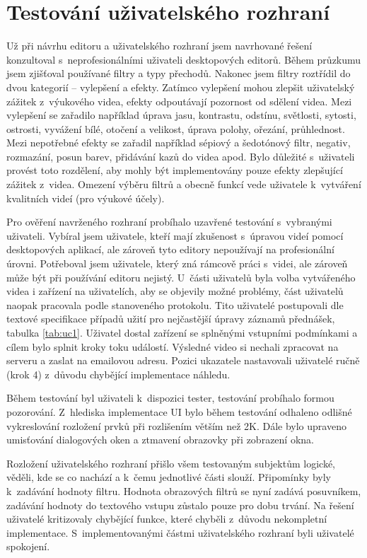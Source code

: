 \section{Testování uživatelského rozhraní}
Už při návrhu editoru a uživatelského rozhraní jsem navrhované řešení konzultoval s~neprofesionálními uživateli desktopových editorů. Během průzkumu jsem zjišťoval používané filtry a typy přechodů. Nakonec jsem filtry roztřídil do dvou kategorií -- vylepšení a efekty. Zatímco vylepšení mohou zlepšit uživatelský zážitek z~výukového videa, efekty odpoutávají pozornost od sdělení videa. Mezi vylepšení se zařadilo například úprava jasu, kontrastu, odstínu, světlosti, sytosti, ostrosti, vyvážení bílé, otočení a velikost, úprava polohy, ořezání, průhlednost. Mezi nepotřebné efekty se zařadil například sépiový a šedotónový filtr, negativ, rozmazání, posun barev, přidávání kazů do videa apod. Bylo důležité s~uživateli provést toto rozdělení, aby mohly být implementovány pouze efekty zlepšující zážitek z~videa. Omezení výběru filtrů a obecně funkcí vede uživatele k~vytváření kvalitních videí (pro výukové účely).

Pro ověření navrženého rozhraní probíhalo uzavřené testování s~vybranými uživateli. Vybíral jsem uživatele, kteří mají zkušenost s~úpravou videí pomocí desktopových aplikací, ale zároveň tyto editory nepoužívají na profesionální úrovni. Potřeboval jsem uživatele, který zná rámcově práci s~videi, ale zároveň může být při používání editoru nejistý. U~části uživatelů byla volba vytvářeného videa i zařízení na uživatelích, aby se objevily možné problémy, část uživatelů naopak pracovala podle stanoveného protokolu. Tito uživatelé postupovali dle textové specifikace případů užití pro nejčastější úpravy záznamů přednášek, tabulka \ref{tab:uc1}. Uživatel dostal zařízení se splněnými vstupními podmínkami a cílem bylo splnit kroky toku událostí. Výsledné video si nechali zpracovat na serveru a zaslat na emailovou adresu. Pozici ukazatele nastavovali uživatelé ručně (krok 4) z~důvodu chybějící implementace náhledu.

Během testování byl uživateli k~dispozici tester, testování probíhalo formou pozorování. Z~hlediska implementace UI bylo během testování odhaleno odlišné vykreslování rozložení prvků při rozlišením větším než 2K. Dále bylo upraveno umisťování dialogových oken a ztmavení obrazovky při zobrazení okna.

Rozložení uživatelského rozhraní přišlo všem testovaným subjektům logické, věděli, kde se co nachází a k~čemu jednotlivé části slouží. Připomínky byly k~zadávání hodnoty filtru. Hodnota obrazových filtrů se nyní zadává posuvníkem, zadávání hodnoty do textového vstupu zůstalo pouze pro dobu trvání. Na řešení uživatelé kritizovaly chybějící funkce, které chyběli z~důvodu nekompletní implementace. S~implementovanými částmi uživatelského rozhraní byli uživatelé spokojení.

